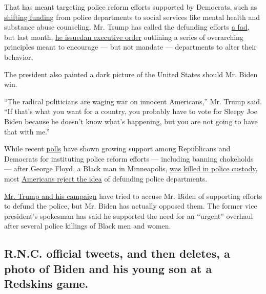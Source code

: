 That has meant targeting police reform efforts supported by Democrats,
such as
\href{https://www.cnn.com/2020/06/25/politics/house-police-reform-legislation-vote/index.html}{shifting
funding} from police departments to social services like mental health
and substance abuse counseling. Mr. Trump has called the defunding
efforts
\href{https://www.politico.com/news/2020/07/10/trump-defund-the-police-fad-356442}{a
fad}, but last month,
\href{https://www.whitehouse.gov/presidential-actions/executive-order-safe-policing-safe-communities/}{he
issued}\textbf{\href{https://www.whitehouse.gov/presidential-actions/executive-order-safe-policing-safe-communities/}{}}\href{https://www.whitehouse.gov/presidential-actions/executive-order-safe-policing-safe-communities/}{an
executive order} outlining a series of overarching principles meant to
encourage --- but not mandate --- departments to alter their behavior.

The president also painted a dark picture of the United States should
Mr. Biden win.

``The radical politicians are waging war on innocent Americans,'' Mr.
Trump said. ``If that's what you want for a country, you probably have
to vote for Sleepy Joe Biden because he doesn't know what's happening,
but you are not going to have that with me.''

While recent
\href{https://www.reuters.com/article/us-minneapolis-police-poll-exclusive/exclusive-most-americans-including-republicans-support-sweeping-democratic-police-reform-proposals-reuters-ipsos-poll-idUSKBN23I380}{polls}
have shown growing support among Republicans and Democrats for
instituting police reform efforts --- including banning chokeholds ---
after George Floyd, a Black man in Minneapolis,
\href{https://www.nytimes.com/2020/05/31/us/george-floyd-investigation.html}{was
killed in police custody}, most
\href{https://fivethirtyeight.com/features/americans-like-the-ideas-behind-defunding-the-police-more-than-the-slogan-itself/}{Americans
reject the idea} of defunding police departments.

\href{https://apnews.com/afs:Content:9083703494}{Mr. Trump and his
campaign} have tried to accuse Mr. Biden of supporting efforts to defund
the police, but Mr. Biden has actually opposed them. The former vice
president's spokesman has said he supported the need for an ``urgent''
overhaul after several police killings of Black men and women.

\hypertarget{rnc-official-tweets-and-then-deletes-a-photo-of-biden-and-his-young-son-at-a-redskins-game}{%
\subsection{R.N.C. official tweets, and then deletes, a photo of Biden
and his young son at a Redskins
game.}\label{rnc-official-tweets-and-then-deletes-a-photo-of-biden-and-his-young-son-at-a-redskins-game}}

